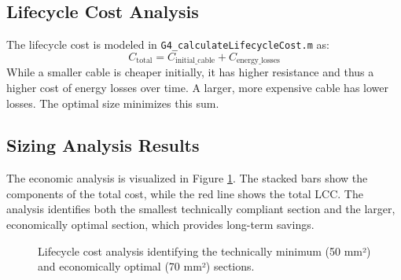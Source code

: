 \documentclass[12pt, a4paper]{article}
\begin{document}
\subsection{Lifecycle Cost Analysis}
The lifecycle cost is modeled in \texttt{G4\_calculateLifecycleCost.m} as:
\begin{equation}
    C_{\text{total}} = C_{\text{initial\_cable}} + C_{\text{energy\_losses}}
\end{equation}
While a smaller cable is cheaper initially, it has higher resistance and thus a higher cost of energy losses over time. A larger, more expensive cable has lower losses. The optimal size minimizes this sum.

\subsection{Sizing Analysis Results}
The economic analysis is visualized in Figure \ref{fig:economic_analysis}. The stacked bars show the components of the total cost, while the red line shows the total LCC. The analysis identifies both the smallest technically compliant section and the larger, economically optimal section, which provides long-term savings.

\begin{figure}[h!]
    \centering
    \caption{Lifecycle cost analysis identifying the technically minimum (50 mm²) and economically optimal (70 mm²) sections.}
    \label{fig:economic_analysis}
\end{figure}
\end{document}
